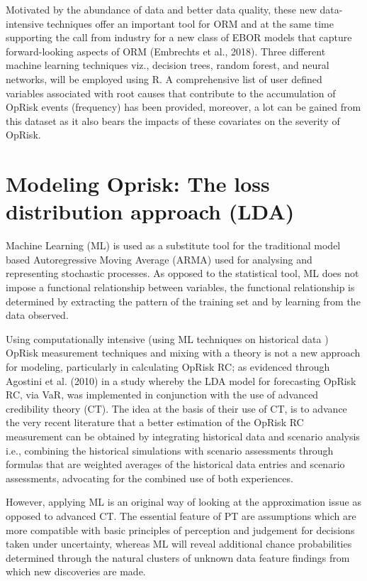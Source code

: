 \documentclass{DissertateUSU}
\begin{document}
Motivated by the abundance of data and better data quality, these new
data-intensive techniques offer an important tool for ORM and at the
same time supporting the call from industry for a new class of EBOR
models that capture forward-looking aspects of ORM (Embrechts et al.,
2018). Three different machine learning techniques viz., decision trees,
random forest, and neural networks, will be employed using R. A
comprehensive list of user defined variables associated with root causes
that contribute to the accumulation of OpRisk events (frequency) has
been provided, moreover, a lot can be gained from this dataset as it
also bears the impacts of these covariates on the severity of OpRisk.

\section{Modeling Oprisk: The loss distribution approach (LDA)}
\label{sec:Modeling Oprisk: The loss distribution approach (LDA)}

Machine Learning (ML) is used as a substitute tool for the traditional
model based Autoregressive Moving Average (ARMA) used for analysing and
representing stochastic processes. As opposed to the statistical tool,
ML does not impose a functional relationship between variables, the
functional relationship is determined by extracting the pattern of the
training set and by learning from the data observed.\medskip 

Using computationally intensive (using ML techniques on historical data
) OpRisk measurement techniques and mixing with a theory is not a new
approach for modeling, particularly in calculating OpRisk RC; as
evidenced through Agostini et al. (2010) in a study whereby the LDA
model for forecasting OpRisk RC, via VaR, was implemented in conjunction
with the use of advanced credibility theory (CT). The idea at the basis
of their use of CT, is to advance the very recent literature that a
better estimation of the OpRisk RC measurement can be obtained by
integrating historical data and scenario analysis i.e., combining the
historical simulations with scenario assessments through formulas that
are weighted averages of the historical data entries and scenario
assessments, advocating for the combined use of both
experiences.\medskip 

However, applying ML is an original way of looking at the approximation
issue as opposed to advanced CT. The essential feature of PT are
assumptions which are more compatible with basic principles of
perception and judgement for decisions taken under uncertainty, whereas
ML will reveal additional chance probabilities determined through the
natural clusters of unknown data feature findings from which new
discoveries are made.\medskip
\end{document}
